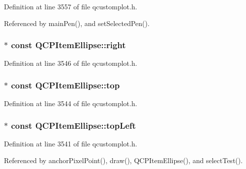 Definition at line 3557 of file qcustomplot.\+h.



Referenced by main\+Pen(), and set\+Selected\+Pen().

\hypertarget{class_q_c_p_item_ellipse_a50091a3bd8761d3ce0d95d9c727e4a82}{}
\subsubsection[{right}]{$\ast$ const Q\+C\+P\+Item\+Ellipse\+::right}\label{class_q_c_p_item_ellipse_a50091a3bd8761d3ce0d95d9c727e4a82}


Definition at line 3546 of file qcustomplot.\+h.

\hypertarget{class_q_c_p_item_ellipse_ad50f907d6f9d1402c6c5d302dca5c5d5}{}
\subsubsection[{top}]{$\ast$ const Q\+C\+P\+Item\+Ellipse\+::top}\label{class_q_c_p_item_ellipse_ad50f907d6f9d1402c6c5d302dca5c5d5}


Definition at line 3544 of file qcustomplot.\+h.

\hypertarget{class_q_c_p_item_ellipse_a12fd8420c06718d0c8a2303d6a652848}{}
\subsubsection[{top\+Left}]{$\ast$ const Q\+C\+P\+Item\+Ellipse\+::top\+Left}\label{class_q_c_p_item_ellipse_a12fd8420c06718d0c8a2303d6a652848}


Definition at line 3541 of file qcustomplot.\+h.



Referenced by anchor\+Pixel\+Point(), draw(), Q\+C\+P\+Item\+Ellipse(), and select\+Test().

\hypertarget{class_q_c_p_item_ellipse_a33ebd2a751b63b9240edc9aa46c19eff}{}
